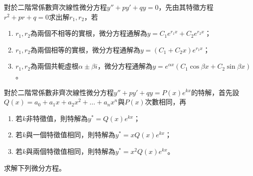 \documentclass[12pt, addpoints]{exam}
\def \d{\mathrm{d}}
\begin{document}
\begin{questions}

\question
對於二階常係數齊次線性微分方程$y''+py'+qy=0$，先由其特徵方程$r^2+pr+q=0$求出解$r_1, r_2$，若
\begin{enumerate}
    \item $r_1, r_2$為兩個不相等的實根，微分方程通解為$\displaystyle y=C_1 e^{r_1 x}+C_2 e^{r_2 x}$；
    \item $r_1, r_2$為兩個相等的實根，微分方程通解為$\displaystyle y=(C_1 + C_2 x) e^{r_1 x}$；
    \item $r_1, r_2$為兩個共軛虛根$\alpha \pm \beta i$，微分方程通解為$\displaystyle y=e^{\alpha x}(C_1 \cos \beta x + C_2 \sin \beta x)$。
\end{enumerate}

\question
對於二階常係數非齊次線性微分方程$y''+py'+qy=P(x)e^{kx}$的特解，首先設$Q(x)=a_0+a_1x+a_2x^2+ \dots +a_nx^n$與$P(x)$次數相同，再
\begin{enumerate}
    \item 若$k$非特徵值，則特解為$y^*=Q(x)e^{kx}$；
    \item 若$k$與一個特徵值相同，則特解為$y^*=xQ(x)e^{kx}$；
    \item 若$k$與兩個特徵值相同，則特解為$y^*=x^2Q(x)e^{kx}$。
\end{enumerate}

\newpage %

\question
求解下列微分方程。
\end{questions}
\end{document}
